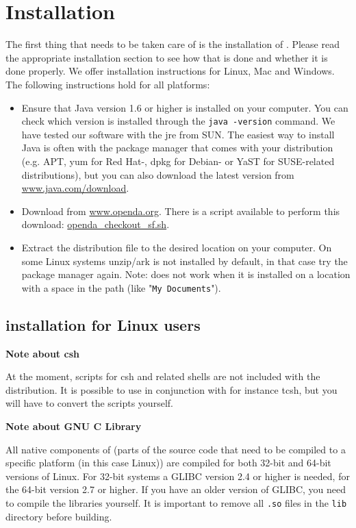 \section{Installation}\label{sec:installation}
The first thing that needs to be taken care of is the installation of \oda. Please read the appropriate installation section to see how that is done and whether it is done properly. We offer installation instructions for Linux, Mac and Windows. The following instructions hold for all platforms: 
\begin{itemize}
\item Ensure that Java version 1.6 or higher is installed on your computer. You can check which version is installed through the \verb|java -version| command. We have tested our software with the jre from SUN. The easiest way to install Java is often with the package manager that comes with your distribution (e.g. APT, yum for Red Hat-, dpkg for Debian- or YaST for SUSE-related distributions), but you can also download the latest version from \href{http://www.java.com/download}{www.java.com/download}.
\item Download \oda from \href{http://www.openda.org}{www.openda.org}. There is a script available to perform this download: \href{http://www.openda.org/docu/openda_2.1/doc/usedoc/openda_checkout_sf.sh}{openda\_checkout\_sf.sh}.
\item Extract the \oda distribution file to the desired location on your computer. On some Linux systems unzip/ark is not installed by default, in that case try the package manager again.  Note: \oda does not work when it is installed on a location with a space in the path (like "\verb|My Documents|").
\end{itemize}

\subsection{\oda installation for Linux users}
\textbf{Note about csh}

At the moment, scripts for csh and related shells are not included with the \oda distribution. It is possible to use \oda in conjunction with for instance tcsh, but you will have to convert the scripts yourself.

\textbf{Note about GNU C Library}

All native components of \oda (parts of the source code that need to be compiled to a specific platform (in this case Linux)) are compiled for both 32-bit and 64-bit versions of Linux. For 32-bit systems a GLIBC version 2.4 or higher is needed, for the 64-bit version 2.7 or higher. If you have an older version of GLIBC, you need to compile the libraries yourself. It is important to remove all \verb|.so| files in the \verb|lib| directory before building. 

